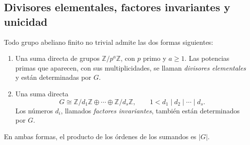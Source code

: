 \subsection{Divisores elementales, factores invariantes y unicidad}\label{tema:10-3-2}
\begin{teo}\label{teo:C10-clasificacion}
Todo grupo abeliano finito no trivial admite las dos formas siguientes:
\begin{enumerate}
\item Una suma directa de grupos $\mathbb Z/p^{a}\mathbb Z$, con $p$ primo y $a\ge1$. Las potencias primas que aparecen, con sus multiplicidades, se llaman \emph{divisores elementales} y están determinadas por $G$.
\item Una suma directa
\[
G\cong\mathbb Z/d_1\mathbb Z\oplus\cdots\oplus\mathbb Z/d_s\mathbb Z,
\qquad 1<d_1\mid d_2\mid\cdots\mid d_s.
\]
Los números $d_i$, llamados \emph{factores invariantes}, también están determinados por $G$.
\end{enumerate}
En ambas formas, el producto de los órdenes de los sumandos es $|G|$.
\end{teo}
